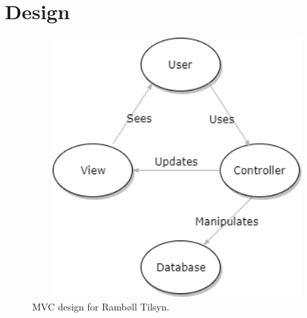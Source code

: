\chapter{Design}

\begin{figure}[H] %
	\centering
	\includegraphics[height=10cm, width=12cm]{../ArkitekturDesign/Design/MVC}
	\caption{MVC design for Rambøll Tilsyn.}
	\label{fig:TierModel}
\end{figure}

